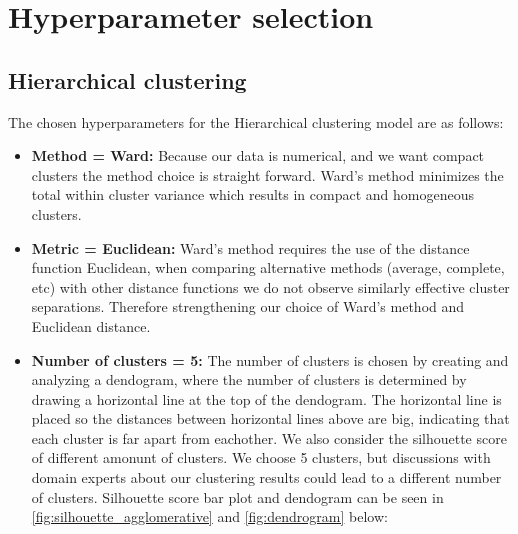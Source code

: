 \section{Hyperparameter selection}

\subsection{Hierarchical clustering}

The chosen hyperparameters for the Hierarchical clustering model are as follows:

\begin{itemize}
    \item \textbf{Method = Ward:} Because our data is numerical, and we want compact clusters the method choice is straight forward. Ward's method minimizes the total within cluster variance which results in compact and homogeneous clusters.
    
    \item \textbf{Metric = Euclidean:} Ward's method requires the use of the distance function Euclidean, when comparing alternative methods (average, complete, etc) with other distance functions we do not observe similarly effective cluster separations. Therefore strengthening our choice of Ward's method and Euclidean distance.
    \item \textbf{Number of clusters = 5:} The number of clusters is chosen by creating and analyzing a dendogram, where the number of clusters is determined by drawing a horizontal line at the top of the dendogram. The horizontal line is placed so the distances between horizontal lines above are big, indicating that each cluster is far apart from eachother. We also consider the silhouette score of different amonunt of clusters. We choose 5 clusters, but discussions with domain experts about our clustering results could lead to a different number of clusters. Silhouette score bar plot and dendogram can be seen in \autoref{fig:silhouette_agglomerative} and \autoref{fig:dendrogram} below:
\end{itemize}


